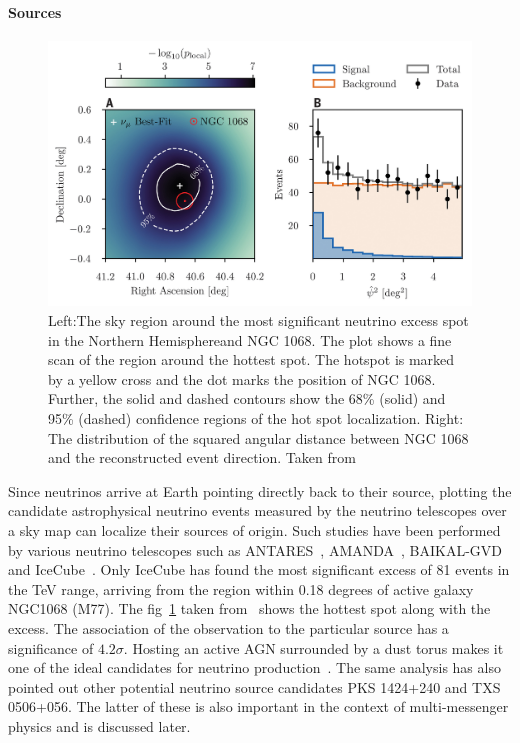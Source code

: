   \paragraph*{Sources}
  \label{subsubsec:Nusources}
  \begin{figure}[t!]
    \centering
    \includegraphics[width=14.5cm]{thesis_figures/CRnNu/science-abg3395-f2.jpg}
    \caption{Left:The sky region around the most significant neutrino excess spot in the Northern Hemisphereand NGC 1068. The plot shows a fine scan of the region around the hottest spot. The hotspot is marked by a yellow cross and the dot marks the position of NGC 1068. Further, 
    the solid and dashed contours show the 68\% (solid) and 95\% (dashed) confidence regions of
    the hot spot localization. Right: The distribution of the squared angular distance between NGC 1068 and the reconstructed event direction. Taken from~\cite{Icecube_2022}}
    \label{fig:NGC1068_excess}
  \end{figure}

  Since neutrinos arrive at Earth pointing directly back to their source, plotting the candidate astrophysical neutrino events measured by the neutrino telescopes over a sky map can localize their sources of origin. Such studies have been performed by various neutrino telescopes such as ANTARES~\cite{Albert_2021}, AMANDA~\cite{Abbasi_2009_Amanda}, BAIKAL-GVD~\cite{Allakhverdyan_2023} and IceCube~\cite{Icecube_2022}. Only IceCube has found the most significant excess of 81 events in the TeV range, arriving from the region within 0.18 degrees of active galaxy NGC1068 (M77). The fig~\ref{fig:NGC1068_excess} taken from~\cite{Icecube_2022} shows the hottest spot along with the excess. The association of the observation to the particular source has a significance of $4.2\sigma$. Hosting an active AGN surrounded by a dust torus makes it one of the ideal candidates for neutrino production~\cite{eichler1979high,berezinsky1981high}. The same analysis has also pointed out other potential neutrino source candidates PKS 1424+240 and TXS 0506+056. The latter of these is also important in the context of multi-messenger physics and is discussed later. 

